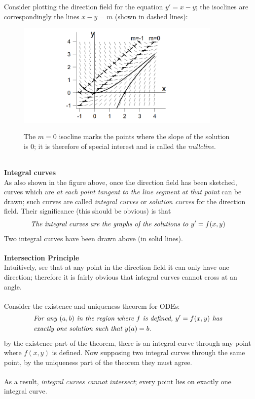 \documentclass{report}
\begin{document}
Consider plotting the direction field for the equation
$y'=x-y$; the isoclines are correspondingly the lines
$x-y=m$ (shown in dashed lines):
\begin{figure}[h]
\begin{center}
\includegraphics[width=10cm]{2}\\
\end{center}
The $m=0$ isocline marks the points where the slope of the solution is 0; it is therefore of special interest 
and is called the \textit{nullcline}.
\end{figure}\\
\textbf{Integral curves}\\
As also shown in the figure above, once the direction field has been sketched, curves which are \textit{at each
point tangent to the line segment at that point} can be drawn; 
such curves are called \textit{integral curves} or \textit{solution curves} for the direction field.
Their significance (this should be obvious) is that
\begin{equation*}
\text{\textit{The integral curves are the graphs of the solutions to }}y'=f(x,y)
\end{equation*}
Two integral curves have been drawn above (in solid lines).\\
\vspace{1mm}\\
\textbf{Intersection Principle}\\
Intuitively, see that at any point in the direction field it can only have one direction; therefore it is fairly
obvious that integral curves cannot cross at an angle.\\
\vspace{1mm}\\
Consider the existence and uniqueness theorem for ODEs: 
\begin{align*}
&\text{\textit{For any $(a,b)$ in the region where $f$ is defined, $y'=f(x,y)$ has}}\\&\text{\textit{exactly one solution such that 
$y(a)=b$.}}
\end{align*}
by the existence part of the theorem, 
there is an integral curve through any point where $f(x,y)$ is defined. Now supposing two integral curves
through the same point, by the uniqueness part of the theorem they must agree.\\
\vspace{1mm}\\
As a result, \textit{integral curves cannot intersect}; every point lies on exactly one integral curve.
\newpage
\end{document}
